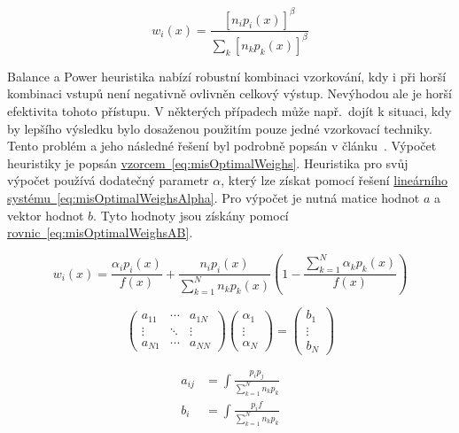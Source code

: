 \documentclass[czech,master]{diploma}
\begin{document}
\begin{equation} \label{eq:balancePowerHeuristic}
  w_i\left( x \right) = \frac{\left[n_{i} p_{i}(x)\right]^\beta}{\sum_{k}\left[n_kp_k(x)\right]^\beta}
\end{equation}

Balance a Power heuristika nabízí robustní kombinaci vzorkování, kdy i při horší kombinaci vstupů není negativně ovlivněn celkový výstup. Nevýhodou ale je horší efektivita tohoto přístupu. V některých případech může např.\ dojít k situaci, kdy by lepšího výsledku bylo dosaženou použitím pouze jedné vzorkovací techniky. Tento problém a jeho následné řešení byl podrobně popsán v článku~\cite{OptimalMIS}. Výpočet heuristiky je popsán \hyperref[eq:misOptimalWeighs]{vzorcem~\ref{eq:misOptimalWeighs}}. Heuristika pro svůj výpočet používá dodatečný parametr \(\alpha\), který lze získat pomocí řešení \hyperref[eq:misOptimalWeighsAlpha]{lineárního systému~\ref{eq:misOptimalWeighsAlpha}}. Pro výpočet je nutná matice hodnot \(a\) a vektor hodnot \(b\). Tyto hodnoty jsou získány pomocí \hyperref[eq:misOptimalWeighsAB]{rovnic~\ref{eq:misOptimalWeighsAB}}.

\begin{equation} \label{eq:misOptimalWeighs}
  w_i\left( x \right) = \frac{\alpha_i p_i\left( x \right)}{f\left( x \right)} + \frac{n_i p_i(x)}{\sum^{N}_{k=1}n_k p_k(x)}\left(1-\frac{\sum^{N}_{k=1}\alpha_k p_k\left( x \right)}{f(x)}\right)
\end{equation}

\begin{equation} \label{eq:misOptimalWeighsAlpha}
  \begin{pmatrix} a_{11} & \cdots & a_{1N} \\ \vdots & \ddots & \vdots \\ a_{N1} & \cdots & a_{NN} \end{pmatrix} \begin{pmatrix} \alpha_{1} \\ \vdots \\ \alpha_{N} \end{pmatrix} = \begin{pmatrix} b_{1} \\ \vdots \\ b_{N} \end{pmatrix}
\end{equation}

\begin{align} \label{eq:misOptimalWeighsAB}
  a_{ij} & = \int\frac{p_i p_j}{\sum^{N}_{k=1}n_k p_k} \\
  b_{i}  & = \int\frac{p_i f}{\sum^{N}_{k=1}n_k p_k}
\end{align}
\end{document}
